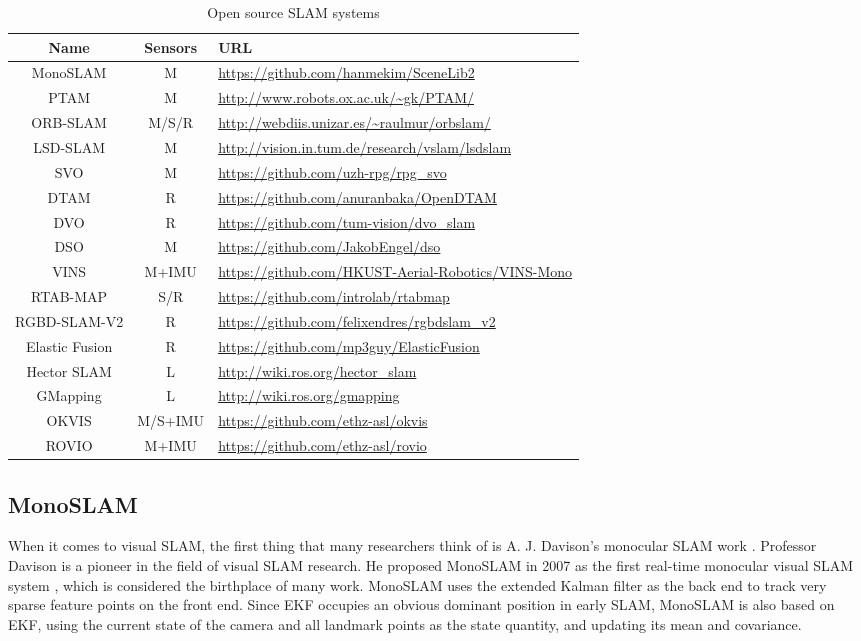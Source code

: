 {
	\begin{table}[!h]
		\small
		\caption{Open source SLAM systems}
		\label{table:opensource-slam}
		\begin{tabu}{@{}c|c|X@{}}
			\toprule
			Name & Sensors & URL \\
			\midrule
			MonoSLAM &  M & \url{https://github.com/hanmekim/SceneLib2}  \\ 
			PTAM & M & \url{http://www.robots.ox.ac.uk/~gk/PTAM/} \\ 
			ORB-SLAM & M/S/R & \url{http://webdiis.unizar.es/~raulmur/orbslam/} \\ 
			LSD-SLAM & M & \url{http://vision.in.tum.de/research/vslam/lsdslam} \smallskip \\
			SVO & M & \url{https://github.com/uzh-rpg/rpg_svo} \\ 
			DTAM & R & \url{https://github.com/anuranbaka/OpenDTAM} \\ 
			DVO & R & \url{https://github.com/tum-vision/dvo_slam} \\ 
			DSO & M & \url{https://github.com/JakobEngel/dso} \\
			VINS & M+IMU & \url{https://github.com/HKUST-Aerial-Robotics/VINS-Mono} \\
			RTAB-MAP & S/R & \url{https://github.com/introlab/rtabmap} \\ 
			RGBD-SLAM-V2 & R & \url{https://github.com/felixendres/rgbdslam_v2} \\ 
			Elastic Fusion & R & \url{https://github.com/mp3guy/ElasticFusion} \\ 
			Hector SLAM & L & \url{http://wiki.ros.org/hector_slam} \\ 
			GMapping & L & \url{http://wiki.ros.org/gmapping} \\ 
			OKVIS & M/S+IMU & \url{https://github.com/ethz-asl/okvis} \\ 
			ROVIO & M+IMU & \url{https://github.com/ethz-asl/rovio} \\ 
			\bottomrule
		\end{tabu}
	\end{table}
}

\subsection{MonoSLAM}
When it comes to visual SLAM, the first thing that many researchers think of is A. J. Davison's monocular SLAM work {\cite{Davison2007,Davison2003}}. Professor Davison is a pioneer in the field of visual SLAM research. He proposed MonoSLAM in 2007 as the first real-time monocular visual SLAM system {\cite{Davison2007}}, which is considered the birthplace of many work. MonoSLAM uses the extended Kalman filter as the back end to track very sparse feature points on the front end. Since EKF occupies an obvious dominant position in early SLAM, MonoSLAM is also based on EKF, using the current state of the camera and all landmark points as the state quantity, and updating its mean and covariance.

